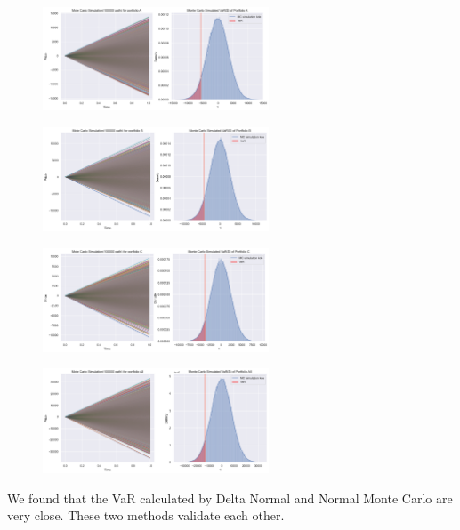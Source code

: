 \documentclass[11pt,en]{elegantpaper}
\begin{document}
\begin{figure}[htbp] 
    \centering 
    \includegraphics[width=0.6\textwidth]{./image/MC_A.png} 
\end{figure}


\begin{figure}[htbp] 
    \centering 
    \includegraphics[width=0.6\textwidth]{./image/MC_B.png} 
\end{figure}


\begin{figure}[htbp] 
    \centering 
    \includegraphics[width=0.6\textwidth]{./image/MC_C.png} 
\end{figure}


\begin{figure}[htbp] 
    \centering 
    \includegraphics[width=0.6\textwidth]{./image/MC_ALL.png} 
\end{figure}

We found that the VaR calculated by Delta Normal and Normal Monte Carlo are very close. These two methods validate each other.
\end{document}
